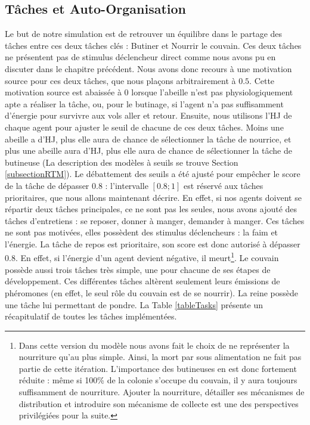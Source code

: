 	\subsection{Tâches et Auto-Organisation}
		Le but de notre simulation est de retrouver un équilibre dans le partage des tâches entre ces deux tâches clés : Butiner et Nourrir le couvain. Ces deux tâches ne présentent pas de stimulus déclencheur direct comme nous avons pu en discuter dans le chapitre précédent. Nous avons donc recours à une motivation source pour ces deux tâches, que nous plaçons arbitrairement à $0.5$. Cette motivation source est abaissée à 0 lorsque l'abeille n'est pas physiologiquement apte a réaliser la tâche, ou, pour le butinage, si l'agent n'a pas suffisamment d'énergie pour survivre aux vols aller et retour. Ensuite, nous utilisons l'HJ de chaque agent pour ajuster le seuil de chacune de ces deux tâches. Moins une abeille a d'HJ, plus elle aura de chance de sélectionner la tâche de nourrice, et plus une abeille aura d'HJ, plus elle aura de chance de sélectionner la tâche de butineuse (La description des modèles à seuils se trouve Section \ref{subsectionRTM}). Le débattement des seuils a été ajusté pour empêcher le score de la tâche de dépasser $0.8$ : l'intervalle $[0.8 ; 1]$ est réservé aux tâches prioritaires, que nous allons maintenant décrire. En effet, si nos agents doivent se répartir deux tâches principales, ce ne sont pas les seules, nous avons ajouté des tâches d'entretiens : se reposer, donner à manger, demander à manger. Ces tâches ne sont pas motivées, elles possèdent des stimulus déclencheurs : la faim et l'énergie. La tâche de repos est prioritaire, son score est donc autorisé à dépasser $0.8$. En effet, si l'énergie d'un agent devient négative, il meurt\footnote{Dans cette version du modèle nous avons fait le choix de ne représenter la nourriture qu'au plus simple. Ainsi, la mort par sous alimentation ne fait pas partie de cette itération. L'importance des butineuses en est donc fortement réduite : même si 100\% de la colonie s'occupe du couvain, il y aura toujours suffisamment de nourriture. Ajouter la nourriture, détailler ses mécanismes de distribution et introduire son mécanisme de collecte est une des perspectives privilégiées pour la suite.}. Le couvain possède aussi trois tâches très simple, une pour chacune de ses étapes de développement. Ces différentes tâches altèrent seulement leurs émissions de phéromones (en effet, le seul rôle du couvain est de se nourrir). La reine possède une tâche lui permettant de pondre. La Table \ref{tableTasks} présente un récapitulatif de toutes les tâches implémentées.
		

